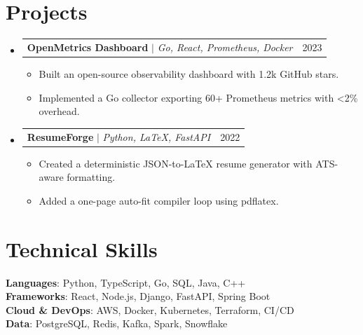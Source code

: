 \documentclass[letterpaper,11pt]{article}
\makeatletter
\newcommand{\resumeItem}[1]{
  \item\small{{#1 \vspace{-2pt}}}
}
\newcommand{\resumeProjectHeading}[2]{
    \item
    \begin{tabular*}{0.97\textwidth}{l@{\extracolsep{\fill}}r}
      \small#1 & #2 \\
    \end{tabular*}\vspace{-7pt}
}
\newcommand{\resumeSubHeadingListStart}{\begin{itemize}[leftmargin=0.15in, label={}]}
\newcommand{\resumeSubHeadingListEnd}{\end{itemize}}
\newcommand{\resumeItemListStart}{\begin{itemize}}
\newcommand{\resumeItemListEnd}{\end{itemize}\vspace{-5pt}}
\makeatother
\begin{document}
\section{Projects}
    \resumeSubHeadingListStart
    \resumeProjectHeading
        {\textbf{OpenMetrics Dashboard} $|$ \emph{Go, React, Prometheus, Docker}}{2023}
      \resumeItemListStart
        \resumeItem{Built an open-source observability dashboard with 1.2k GitHub stars.}
        \resumeItem{Implemented a Go collector exporting 60+ Prometheus metrics with \textless{}2\% overhead.}
      \resumeItemListEnd
    \resumeProjectHeading
        {\textbf{ResumeForge} $|$ \emph{Python, LaTeX, FastAPI}}{2022}
      \resumeItemListStart
        \resumeItem{Created a deterministic JSON-to-LaTeX resume generator with ATS-aware formatting.}
        \resumeItem{Added a one-page auto-fit compiler loop using pdflatex.}
      \resumeItemListEnd
    \resumeSubHeadingListEnd

\section{Technical Skills}
 \begin{itemize}[leftmargin=0.15in, label={}]
    \small{\item{
     \textbf{Languages}{: Python, TypeScript, Go, SQL, Java, C++} \\
     \textbf{Frameworks}{: React, Node.js, Django, FastAPI, Spring Boot} \\
     \textbf{Cloud \& DevOps}{: AWS, Docker, Kubernetes, Terraform, CI/CD} \\
     \textbf{Data}{: PostgreSQL, Redis, Kafka, Spark, Snowflake}
    }}
 \end{itemize}
\end{document}
